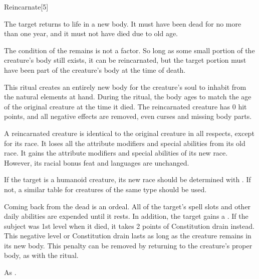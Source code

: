 \begin{spellsection}{Reincarnate}[5]
    \begin{spellheader}
    \end{spellheader}
    \begin{spellcontent}
        \begin{spelltargetinginfo}
        \end{spelltargetinginfo}
        \begin{spelleffects}
            \spelleffect The target returns to life in a new body. It must have been dead for no more than one year, and it must not have died due to old age.

            The condition of the remains is not a factor. So long as some small portion of the creature's body still exists, it can be reincarnated, but the target portion must have been part of the creature's body at the time of death.

            This ritual creates an entirely new body for the creature's soul to inhabit from the natural elements at hand. During the ritual, the body ages to match the age of the original creature at the time it died. The reincarnated creature has 0 hit points, and all negative effects are removed, even curses and missing body parts.

            A reincarnated creature is identical to the original creature in all respects, except for its race. It loses all the attribute modifiers and special abilities from its old race. It gains the attribute modifiers and special abilities of its new race. However, its racial bonus feat and languages are unchanged.

            If the target is a humanoid creature, its new race should be determined with . If not, a similar table for creatures of the same type should be used.

            Coming back from the dead is an ordeal. All of the target's spell slots and other daily abilities are expended until it rests. In addition, the target gains a \negativelevel. If the subject was 1st level when it died, it takes 2 points of Constitution drain instead. This negative level or Constitution drain lasts as long as the creature remains in its new body. This penalty can be removed by returning to the creature's proper body, as with the  ritual.
        \end{spelleffects}
    \end{spellcontent}
    \begin{spellfooter}
        \spellnotes As .
    \end{spellfooter}
\end{spellsection}
